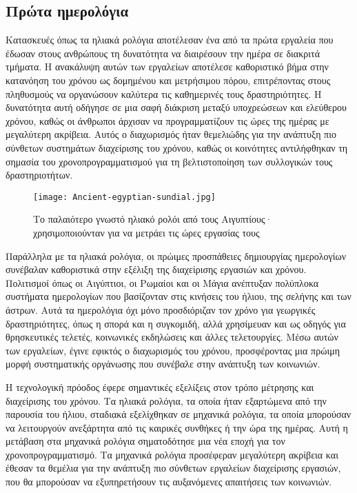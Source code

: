 
        \subsection{Πρώτα ημερολόγια}
            Κατασκευές όπως τα ηλιακά ρολόγια αποτέλεσαν ένα από τα πρώτα εργαλεία που έδωσαν στους ανθρώπους τη δυνατότητα να διαιρέσουν την ημέρα σε διακριτά τμήματα. Η ανακάλυψη αυτών των εργαλείων αποτέλεσε καθοριστικό βήμα στην κατανόηση του χρόνου ως δομημένου και μετρήσιμου πόρου, επιτρέποντας στους πληθυσμούς να οργανώσουν καλύτερα τις καθημερινές τους δραστηριότητες. Η δυνατότητα αυτή οδήγησε σε μια σαφή διάκριση μεταξύ υποχρεώσεων και ελεύθερου χρόνου, καθώς οι άνθρωποι άρχισαν να προγραμματίζουν τις ώρες της ημέρας με μεγαλύτερη ακρίβεια. Αυτός ο διαχωρισμός ήταν θεμελιώδης για την ανάπτυξη πιο σύνθετων συστημάτων διαχείρισης του χρόνου, καθώς οι κοινότητες αντιλήφθηκαν τη σημασία του χρονοπρογραμματισμού για τη βελτιστοποίηση των συλλογικών τους δραστηριοτήτων.

            \begin{figure}[h!] \noindent \centering
                \texttt{[image: Ancient-egyptian-sundial.jpg]}
                \caption{\centering Το παλαιότερο γνωστό ηλιακό ρολόι από τους Αιγυπτίους· \\ χρησιμοποιούνταν για να μετράει τις ώρες εργασίας τους}
            \end{figure}

            Παράλληλα με τα ηλιακά ρολόγια, οι πρώιμες προσπάθειες δημιουργίας ημερολογίων συνέβαλαν καθοριστικά στην εξέλιξη της διαχείρισης εργασιών και χρόνου. Πολιτισμοί όπως οι Αιγύπτιοι, οι Ρωμαίοι και οι Μάγια ανέπτυξαν πολύπλοκα συστήματα ημερολογίων που βασίζονταν στις κινήσεις του ήλιου, της σελήνης και των άστρων. Αυτά τα ημερολόγια όχι μόνο προσδιόριζαν τον χρόνο για γεωργικές δραστηριότητες, όπως η σπορά και η συγκομιδή, αλλά χρησίμευαν και ως οδηγός για θρησκευτικές τελετές, κοινωνικές εκδηλώσεις και άλλες τελετουργίες. Μέσω αυτών των εργαλείων, έγινε εφικτός ο διαχωρισμός του χρόνου, προσφέροντας μια πρώιμη μορφή συστηματικής οργάνωσης που συνέβαλε στην ανάπτυξη των κοινωνιών. \cite{Richards_2000}

            Η τεχνολογική πρόοδος έφερε σημαντικές εξελίξεις στον τρόπο μέτρησης και διαχείρισης του χρόνου. Τα ηλιακά ρολόγια, τα οποία ήταν εξαρτώμενα από την παρουσία του ήλιου, σταδιακά εξελίχθηκαν σε μηχανικά ρολόγια, τα οποία μπορούσαν να λειτουργούν ανεξάρτητα από τις καιρικές συνθήκες ή την ώρα της ημέρας. Αυτή η μετάβαση στα μηχανικά ρολόγια σηματοδότησε μια νέα εποχή για τον χρονοπρογραμματισμό. Τα μηχανικά ρολόγια προσέφεραν μεγαλύτερη ακρίβεια και έθεσαν τα θεμέλια για την ανάπτυξη πιο σύνθετων εργαλείων διαχείρισης εργασιών, που θα μπορούσαν να εξυπηρετήσουν τις αυξανόμενες απαιτήσεις των κοινωνιών.

